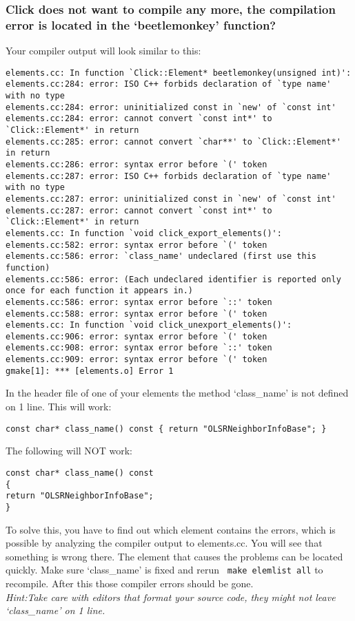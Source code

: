 \documentclass[a4paper]{article}
\begin{document}
\subsubsection*{Click does not want to compile any more, the compilation error is
located in the `beetlemonkey' function?}

Your compiler output will look similar to this:
\begin{lstlisting}
elements.cc: In function `Click::Element* beetlemonkey(unsigned int)':
elements.cc:284: error: ISO C++ forbids declaration of `type name' with no type
elements.cc:284: error: uninitialized const in `new' of `const int'
elements.cc:284: error: cannot convert `const int*' to `Click::Element*' in return
elements.cc:285: error: cannot convert `char**' to `Click::Element*' in return
elements.cc:286: error: syntax error before `(' token
elements.cc:287: error: ISO C++ forbids declaration of `type name' with no type
elements.cc:287: error: uninitialized const in `new' of `const int'
elements.cc:287: error: cannot convert `const int*' to `Click::Element*' in return
elements.cc: In function `void click_export_elements()':
elements.cc:582: error: syntax error before `(' token
elements.cc:586: error: `class_name' undeclared (first use this function)
elements.cc:586: error: (Each undeclared identifier is reported only once for each function it appears in.)
elements.cc:586: error: syntax error before `::' token
elements.cc:588: error: syntax error before `(' token
elements.cc: In function `void click_unexport_elements()':
elements.cc:906: error: syntax error before `(' token
elements.cc:908: error: syntax error before `::' token
elements.cc:909: error: syntax error before `(' token
gmake[1]: *** [elements.o] Error 1 
\end{lstlisting}

In the header file of one of your elements the method `class\_name' is
not defined on 1 line. This will work:\\

\begin{lstlisting}
const char* class_name() const { return "OLSRNeighborInfoBase"; }
\end{lstlisting}
The following will NOT work:\\
\begin{lstlisting}
const char* class_name() const
{
return "OLSRNeighborInfoBase";
}
\end{lstlisting}
To solve this, you have to find out which element contains the errors,
which is possible by analyzing the compiler output to elements.cc. You
will see that something is wrong there. The element that causes the
problems can be located quickly. Make sure `class\_name' is fixed and
rerun \texttt{       make elemlist all} to recompile. After this those
compiler errors should be gone.\\ \emph{Hint:Take care with editors that
format your source code, they might not leave `class\_name' on 1 line.}
\end{document}
